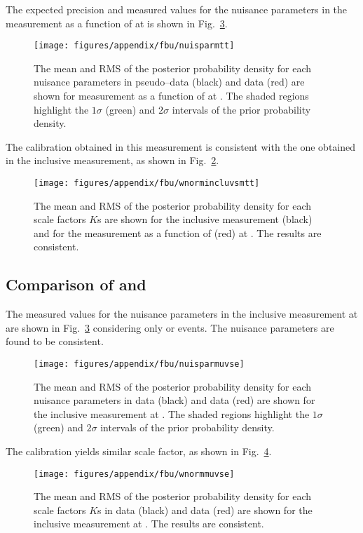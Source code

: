 The expected precision and measured values for the nuisance parameters
in the measurement as a function of \mtt{} at \eighttev{} is shown in
Fig.~\ref{fig:nuisparmtt}.
\begin{figure}[!htb]\centering
  \texttt{[image: figures/appendix/fbu/nuisparmtt]}
  \caption{The mean and RMS of the posterior probability density for
    each nuisance parameters in pseudo--data (black) and data 
    (red) are shown for \ac{} measurement as a function of \mtt{} at \eighttev{}. The
    shaded regions highlight the $1\sigma$ (green) and $2\sigma$
    intervals of the prior probability density.}
  \label{fig:nuisparmtt}
\end{figure}
The \wjets{} calibration obtained in this measurement is consistent
with the one obtained in the inclusive measurement, as shown in
Fig.~\ref{fig:wnormincluvsmtt}. 
\begin{figure}[!htb]\centering
  \texttt{[image: figures/appendix/fbu/wnormincluvsmtt]}
  \caption{The mean and RMS of the posterior probability density for
    each \wjets{} scale factors $K$s are shown for the inclusive
    measurement (black) and for the measurement as a function of
    \mtt{} (red) at \eighttev{}. The results are consistent.}
  \label{fig:wnormincluvsmtt}
\end{figure}

\subsection{Comparison of \mujets{} and \ejets{}}
\label{app:unf:evsmu}

The measured values for the nuisance parameters
in the inclusive measurement at \eighttev{} are shown in
Fig.~\ref{fig:nuisparmtt} considering only \mujets{} or \ejets{}
events. The nuisance parameters are found to be consistent.
\begin{figure}[!htb]\centering
  \texttt{[image: figures/appendix/fbu/nuisparmuvse]}
  \caption{The mean and RMS of the posterior probability density for
    each nuisance parameters in \mujets{} data (black) and \ejets{}
    data (red) are shown for the inclusive \ac{} measurement at \eighttev{}. The
    shaded regions highlight the $1\sigma$ (green) and $2\sigma$
    intervals of the prior probability density.}
  \label{fig:nuisparmtt}
\end{figure}
The \wjets{} calibration yields similar scale factor, as shown in
Fig.~\ref{fig:wnormmuvse}.
\begin{figure}[!htb]\centering
  \texttt{[image: figures/appendix/fbu/wnormmuvse]}
  \caption{The mean and RMS of the posterior probability density for
    each \wjets{} scale factors $K$s in \mujets{} data (black)
    and \ejets{} data (red) are shown for the inclusive
    measurement at \eighttev{}. The results are consistent.}
  \label{fig:wnormmuvse}
\end{figure}

